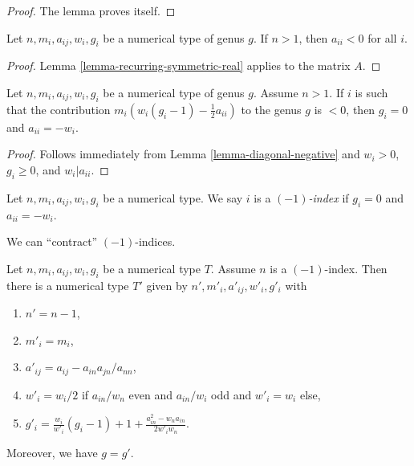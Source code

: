 \begin{proof}
The lemma proves itself.
\end{proof}

\begin{lemma}
\label{lemma-diagonal-negative}
Let $n, m_i, a_{ij}, w_i, g_i$ be a numerical type of genus $g$.
If $n > 1$, then $a_{ii} < 0$ for all $i$.
\end{lemma}

\begin{proof}
Lemma \ref{lemma-recurring-symmetric-real} applies to the matrix $A$.
\end{proof}

\begin{lemma}
\label{lemma-minus-one}
Let $n, m_i, a_{ij}, w_i, g_i$ be a numerical type of genus $g$.
Assume $n > 1$. If $i$ is such that the contribution
$m_i(w_i(g_i - 1) - \frac{1}{2} a_{ii})$
to the genus $g$ is $< 0$, then $g_i = 0$ and $a_{ii} = -w_i$.
\end{lemma}

\begin{proof}
Follows immediately from Lemma \ref{lemma-diagonal-negative} and
$w_i > 0$, $g_i \geq 0$, and $w_i | a_{ii}$.
\end{proof}

\begin{definition}
\label{definition-type-minus-one}
Let $n, m_i, a_{ij}, w_i, g_i$ be a numerical type.
We say $i$ is a {\it $(-1)$-index} if $g_i = 0$ and $a_{ii} = -w_i$.
\end{definition}

\noindent
We can ``contract'' $(-1)$-indices.

\begin{lemma}
\label{lemma-contract}
Let $n, m_i, a_{ij}, w_i, g_i$ be a numerical type $T$.
Assume $n$ is a $(-1)$-index. Then there is a numerical
type $T'$ given by $n', m'_i, a'_{ij}, w'_i, g'_i$ with
\begin{enumerate}
\item $n' = n - 1$,
\item $m'_i = m_i$,
\item $a'_{ij} = a_{ij} - a_{in}a_{jn}/a_{nn}$,
\item $w'_i = w_i/2$ if $a_{in}/w_n$ even and $a_{in}/w_i$ odd
and $w'_i = w_i$ else,
\item $g'_i =
\frac{w_i}{w'_i}(g_i - 1) + 1 + \frac{a_{in}^2 - w_na_{in}}{2w'_iw_n}$.
\end{enumerate}
Moreover, we have $g = g'$.
\end{lemma}

